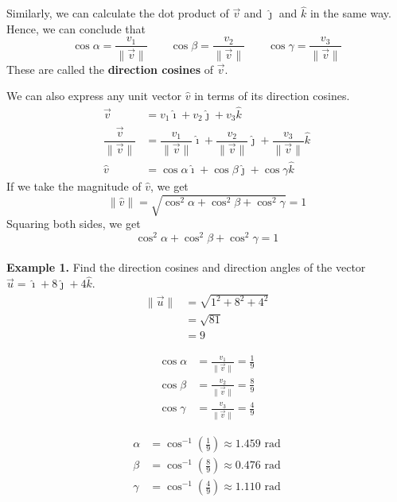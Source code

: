 \documentclass{report}
\begin{document}
\newpage
Similarly, we can calculate the dot product of $\vec{v}$ and $\hat{\jmath}$ and
$\hat{k}$ in the same way. Hence, we can conclude that \[\cos\alpha = \frac{v_1}{\lVert \vec{v} \rVert} \qquad \cos\beta = \frac{v_2}{\lVert \vec{v} \rVert} \qquad \cos\gamma = \frac{v_3}{\lVert \vec{v} \rVert}\]
These are called the \textbf{direction cosines} of $\vec{v}$.

We can also express any unit vector $\hat{v}$ in terms of its direction
cosines.
\begin{align*}
    \vec{v}                                & = v_1\hat{\imath} + v_2\hat{\jmath} + v_3\hat{k}                                                                                              \\
    \dfrac{\vec{v}}{\lVert \vec{v} \rVert} & = \dfrac{v_1}{\lVert \vec{v} \rVert}\hat{\imath} + \dfrac{v_2}{\lVert \vec{v} \rVert}\hat{\jmath} + \dfrac{v_3}{\lVert \vec{v} \rVert}\hat{k} \\
    \hat{v}                                & = \cos\alpha\hat{\imath} + \cos\beta\hat{\jmath} + \cos\gamma\hat{k}
\end{align*}
If we take the magnitude of $\hat{v}$, we get \[\lVert \hat{v} \rVert = \sqrt{\cos^2\alpha + \cos^2\beta + \cos^2\gamma} = 1\] Squaring both sides, we get \[\cos^2\alpha + \cos^2\beta + \cos^2\gamma = 1\]
~\\
\noindent\textbf{Example 1. } Find the direction cosines and direction angles of the vector $\vec{u} = \hat{\imath} + 8\hat{\jmath} + 4\hat{k}$.
\begin{align*}
    \lVert \vec{u} \rVert & = \sqrt{1^2 + 8^2 + 4^2} \\
                          & = \sqrt{81}              \\
                          & = 9
\end{align*}
\vspace{-5em}
\begin{multicols}{2}
    \begin{align*}
        \cos\alpha & = \frac{v_1}{\lVert \vec{v} \rVert} = \frac{1}{9} \\
        \cos\beta  & = \frac{v_2}{\lVert \vec{v} \rVert} = \frac{8}{9} \\
        \cos\gamma & = \frac{v_3}{\lVert \vec{v} \rVert} = \frac{4}{9}
    \end{align*}

    \begin{align*}
        \alpha & = \cos^{-1}\left(\frac{1}{9}\right) \approx 1.459 \text{ rad} \\
        \beta  & = \cos^{-1}\left(\frac{8}{9}\right) \approx 0.476 \text{ rad} \\
        \gamma & = \cos^{-1}\left(\frac{4}{9}\right) \approx 1.110 \text{ rad}
    \end{align*}
\end{multicols}
\end{document}
